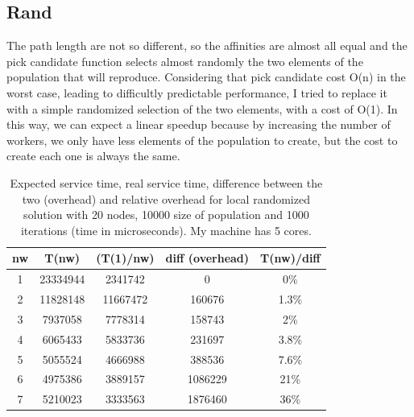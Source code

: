\documentclass{article}
\begin{document}
	\subsection{Rand}\label{sec:s32}
The path length are not so different, so the affinities are almost all equal and the pick candidate function selects almost randomly the two elements of the population that will reproduce. Considering that pick candidate cost O(n) in the worst case, leading to difficultly predictable performance, I tried to replace it with a simple randomized selection of the two elements, with a cost of O(1). In this way, we can expect a linear speedup because by increasing the number of workers, we only have less elements of the population to create, but the cost to create each one is always the same.

        \begin{table}[h!]
            \begin{center}
                \caption{Expected service time, real service time, difference between the two (overhead) and relative overhead for local randomized solution with 20 nodes, 10000 size of population and 1000 iterations (time in microseconds). My machine has 5 cores.}
                \label{tab:table1}
                \begin{tabular}{c|c|c|c|c}
                    \textbf{nw} & \textbf{T(nw)} & \textbf{(T(1)/nw)} & \textbf{diff (overhead)} & \textbf{T(nw)/diff}\\
                    \hline
                        1 & 23334944 & 2341742 & 0 & 0\%\\
                        2 & 11828148 & 11667472 & 160676 & 1.3\%\\
			3 & 7937058 & 7778314 & 158743 & 2\%\\
			4 & 6065433 & 5833736 & 231697 & 3.8\%\\
			5 & 5055524 & 4666988 & 388536 & 7.6\%\\
			6 & 4975386 & 3889157 & 1086229 & 21\%\\
			7 & 5210023 & 3333563 & 1876460 & 36\%\\
                \end{tabular}
            \end{center}
        \end{table}
\end{document}
